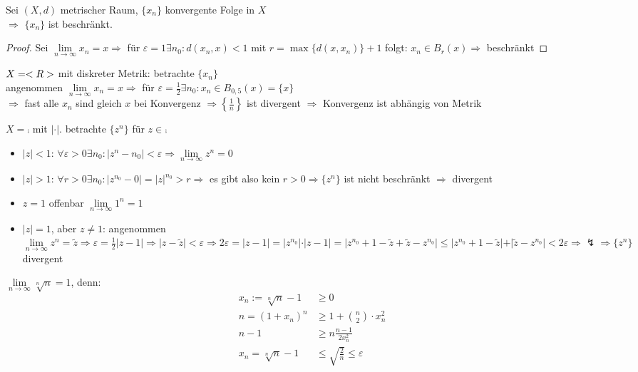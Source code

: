 \begin{proposition}
	Sei $(X,d)$ metrischer Raum, $\{x_n\}$ konvergente Folge in $X$\\
    $\Rightarrow$ $\{x_n\}$ ist beschränkt.
\end{proposition}
\begin{proof}
	Sei $\lim\limits_{n\to\infty} x_n=x\Rightarrow$ für $\varepsilon=1\exists n_0:d(x_n,x)<1$ mit $r=\max\{d(x,x_n)\}+1$ folgt: $x_n\in B_r(x)\Rightarrow$ beschränkt
\end{proof}

\begin{example}
	$X=<R>$ mit diskreter Metrik: betrachte $\{x_n\}$ \\
	angenommen $\lim\limits_{n\to\infty} x_n=x\Rightarrow$ für $\varepsilon=\frac{1}{2}\exists n_0: x_n\in B_{0,5}(x)=\{x\}$ \\
	$\Rightarrow$ fast alle $x_n$ sind gleich $x$ bei Konvergenz $\Rightarrow \left\lbrace \frac{1}{n}\right\rbrace$ ist divergent $\Rightarrow$ Konvergenz ist abhängig von Metrik
\end{example}

\begin{example}
	$X=\comp$ mit $\vert\cdot\vert$. betrachte $\{z^n\}$ für $z\in\comp$
	\begin{itemize}
		\item $\vert z \vert < 1$: $\forall\varepsilon >0\exists n_0:\vert z^n-n_0\vert<\varepsilon\Rightarrow\lim\limits_{n\to\infty} z^n=0$
		\item $\vert z \vert > 1$: $\forall r>0\exists n_0:\vert z^{n_0}-0\vert=\vert z\vert^{n_0}>r\Rightarrow$ es gibt also kein $r>0\Rightarrow \{z^n\}$ ist nicht beschränkt $\Rightarrow$ divergent
		\item $z=1$ offenbar $\lim\limits_{n\to\infty} 1^n=1$
		\item $\vert z\vert =1$, aber $z\neq 1$: angenommen $\lim\limits_{n\to\infty} z^n=\tilde z\Rightarrow \varepsilon=\frac{1}{2}\vert z-1\vert\Rightarrow \vert z-\tilde{z}\vert<\varepsilon\Rightarrow 2\varepsilon=\vert z-1\vert=\vert z^{n_0}\vert\cdot\vert z-1\vert=\vert z^{n_0}+1-\tilde{z}+\tilde{z}-z^{n_0}\vert\le\vert z^{n_0}+1-\tilde{z}\vert+\vert\tilde{z}-z^{n_0}\vert< 2\varepsilon\Rightarrow\lightning\Rightarrow \{z^n\}$ divergent
	\end{itemize}
\end{example}

\begin{example}
	$\lim\limits_{n\to\infty} \sqrt[n]{n}=1$, denn: \\
	\begin{align*}
		x_n:=\sqrt[n]{n}-1&\ge 0 \\
		n=(1+x_n)^n&\ge 1+\binom{n}{2}\cdot x_n^2 \\
		n-1 &\ge n\frac{n-1}{2x_n^2} \\
		x_n=\sqrt[n]{n}-1 &\le \sqrt{\frac{2}{n}}\le \varepsilon
	\end{align*}
\end{example}

